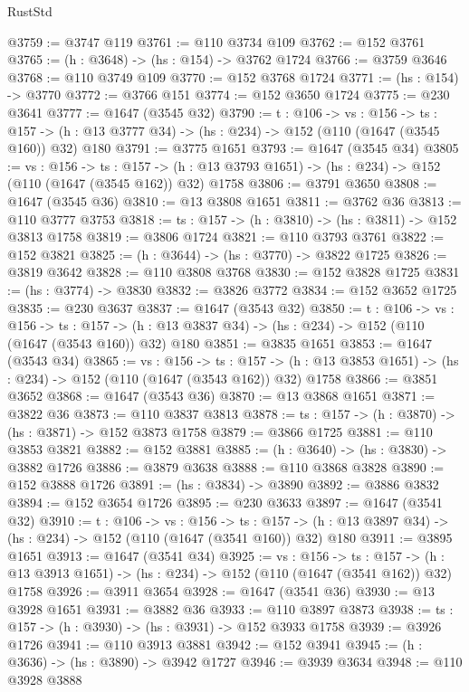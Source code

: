 \begin{lexlean}{RustStd}
\begin{coremodule}
@3759 := @3747 @119
@3761 := @110 @3734 @109
@3762 := @152 @3761
@3765 := (h : @3648) -> (hs : @154) -> @3762 @1724
@3766 := @3759 @3646
@3768 := @110 @3749 @109
@3770 := @152 @3768 @1724
@3771 := (hs : @154) -> @3770
@3772 := @3766 @151
@3774 := @152 @3650 @1724
@3775 := @230 @3641
@3777 := @1647 (@3545 @32)
@3790 := {t : @106} ->
  {vs : @156} ->
  {ts : @157} -> (h : @13 @3777 @34) -> (hs : @234) -> @152 (@110 (@1647 (@3545 @160)) @32) @180
@3791 := @3775 @1651
@3793 := @1647 (@3545 @34)
@3805 := {vs : @156} ->
  {ts : @157} -> (h : @13 @3793 @1651) -> (hs : @234) -> @152 (@110 (@1647 (@3545 @162)) @32) @1758
@3806 := @3791 @3650
@3808 := @1647 (@3545 @36)
@3810 := @13 @3808 @1651
@3811 := @3762 @36
@3813 := @110 @3777 @3753
@3818 := {ts : @157} -> (h : @3810) -> (hs : @3811) -> @152 @3813 @1758
@3819 := @3806 @1724
@3821 := @110 @3793 @3761
@3822 := @152 @3821
@3825 := (h : @3644) -> (hs : @3770) -> @3822 @1725
@3826 := @3819 @3642
@3828 := @110 @3808 @3768
@3830 := @152 @3828 @1725
@3831 := (hs : @3774) -> @3830
@3832 := @3826 @3772
@3834 := @152 @3652 @1725
@3835 := @230 @3637
@3837 := @1647 (@3543 @32)
@3850 := {t : @106} ->
  {vs : @156} ->
  {ts : @157} -> (h : @13 @3837 @34) -> (hs : @234) -> @152 (@110 (@1647 (@3543 @160)) @32) @180
@3851 := @3835 @1651
@3853 := @1647 (@3543 @34)
@3865 := {vs : @156} ->
  {ts : @157} -> (h : @13 @3853 @1651) -> (hs : @234) -> @152 (@110 (@1647 (@3543 @162)) @32) @1758
@3866 := @3851 @3652
@3868 := @1647 (@3543 @36)
@3870 := @13 @3868 @1651
@3871 := @3822 @36
@3873 := @110 @3837 @3813
@3878 := {ts : @157} -> (h : @3870) -> (hs : @3871) -> @152 @3873 @1758
@3879 := @3866 @1725
@3881 := @110 @3853 @3821
@3882 := @152 @3881
@3885 := (h : @3640) -> (hs : @3830) -> @3882 @1726
@3886 := @3879 @3638
@3888 := @110 @3868 @3828
@3890 := @152 @3888 @1726
@3891 := (hs : @3834) -> @3890
@3892 := @3886 @3832
@3894 := @152 @3654 @1726
@3895 := @230 @3633
@3897 := @1647 (@3541 @32)
@3910 := {t : @106} ->
  {vs : @156} ->
  {ts : @157} -> (h : @13 @3897 @34) -> (hs : @234) -> @152 (@110 (@1647 (@3541 @160)) @32) @180
@3911 := @3895 @1651
@3913 := @1647 (@3541 @34)
@3925 := {vs : @156} ->
  {ts : @157} -> (h : @13 @3913 @1651) -> (hs : @234) -> @152 (@110 (@1647 (@3541 @162)) @32) @1758
@3926 := @3911 @3654
@3928 := @1647 (@3541 @36)
@3930 := @13 @3928 @1651
@3931 := @3882 @36
@3933 := @110 @3897 @3873
@3938 := {ts : @157} -> (h : @3930) -> (hs : @3931) -> @152 @3933 @1758
@3939 := @3926 @1726
@3941 := @110 @3913 @3881
@3942 := @152 @3941
@3945 := (h : @3636) -> (hs : @3890) -> @3942 @1727
@3946 := @3939 @3634
@3948 := @110 @3928 @3888

\end{coremodule}
\end{lexlean}

